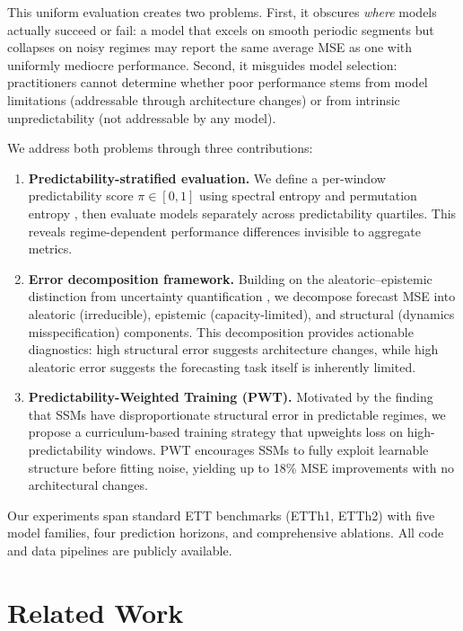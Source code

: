 \documentclass[10pt]{article}
\newcommand{\pwt}{\textsc{PWT}}
\newcommand{\predscore}{\pi}
\begin{document}
This uniform evaluation creates two problems. First, it obscures \emph{where} models actually succeed or fail: a model that excels on smooth periodic segments but collapses on noisy regimes may report the same average MSE as one with uniformly mediocre performance. Second, it misguides model selection: practitioners cannot determine whether poor performance stems from model limitations (addressable through architecture changes) or from intrinsic unpredictability (not addressable by any model).

We address both problems through three contributions:

\begin{enumerate}
    \item \textbf{Predictability-stratified evaluation.} We define a per-window predictability score $\predscore \in [0,1]$ using spectral entropy and permutation entropy \citep{bandt2002permutation}, then evaluate models separately across predictability quartiles. This reveals regime-dependent performance differences invisible to aggregate metrics.

    \item \textbf{Error decomposition framework.} Building on the aleatoric--epistemic distinction from uncertainty quantification \citep{der2009aleatory}, we decompose forecast MSE into aleatoric (irreducible), epistemic (capacity-limited), and structural (dynamics misspecification) components. This decomposition provides actionable diagnostics: high structural error suggests architecture changes, while high aleatoric error suggests the forecasting task itself is inherently limited.

    \item \textbf{Predictability-Weighted Training (\pwt{}).} Motivated by the finding that SSMs have disproportionate structural error in predictable regimes, we propose a curriculum-based training strategy that upweights loss on high-predictability windows. \pwt{} encourages SSMs to fully exploit learnable structure before fitting noise, yielding up to 18\% MSE improvements with no architectural changes.
\end{enumerate}

Our experiments span standard ETT benchmarks (ETTh1, ETTh2) with five model families, four prediction horizons, and comprehensive ablations. All code and data pipelines are publicly available.

\section{Related Work}
\label{sec:related}
\end{document}
